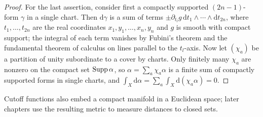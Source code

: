 \begin{proof}
For the last assertion, consider first a compactly supported $(2n-1)$-form $\gamma$ in a single chart. Then $\mathrm{d}\gamma$ is a sum of terms $\pm\partial_{t_l}g\,\mathrm dt_1\wedge\cdots\wedge\mathrm dt_{2n}$, where $t_1,\ldots,t_{2n}$ are the real coordinates $x_1,y_1,\ldots,x_n,y_n$ and $g$ is smooth with compact support; the integral of each term vanishes by Fubini's theorem and the fundamental theorem of calculus on lines parallel to the $t_l$-axis. Now let $(\chi_a)$ be a partition of unity subordinate to a cover by charts. Only finitely many $\chi_a$ are nonzero on the compact set $\operatorname{Supp}\alpha$, so $\alpha=\sum_a\chi_a\alpha$ is a finite sum of compactly supported forms in single charts, and $\int_X\mathrm d\alpha=\sum_a\int_X\mathrm d(\chi_a\alpha)=0$.
\end{proof}

Cutoff functions also embed a compact manifold in a Euclidean space; later chapters use the resulting metric to measure distances to closed sets.

